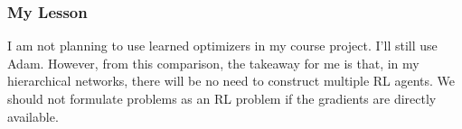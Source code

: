 \subsubsection{My Lesson}
I am not planning to use learned optimizers in my course project.
I'll still use Adam.
However, from this comparison, the takeaway for me is that, in my hierarchical networks, there will be no need to construct multiple RL agents.
We should not formulate problems as an RL problem if the gradients are directly available.






